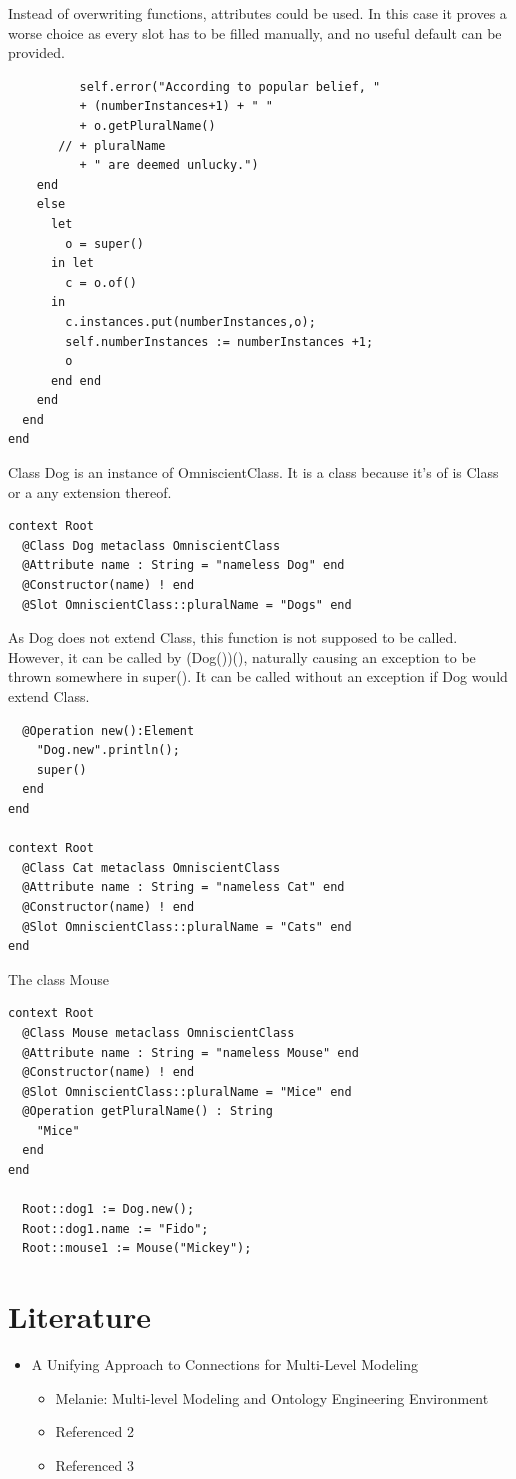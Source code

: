 \documentclass{scrreprt}
\newcommand{\layerOne}[1]{\chapter{#1}}
\begin{document}
Instead of overwriting functions, attributes could be used. In this case it
proves a worse choice as every slot has to be filled manually, and no useful
default can be provided.
\begin{verbatim}
          self.error("According to popular belief, " 
          + (numberInstances+1) + " " 
          + o.getPluralName() 
       // + pluralName 
          + " are deemed unlucky.")
    end
    else 
      let 
        o = super()
      in let
        c = o.of()
      in
        c.instances.put(numberInstances,o);
        self.numberInstances := numberInstances +1;
        o
      end end
    end
  end
end
\end{verbatim}
Class {\ttfamily Dog} is an instance of {\ttfamily OmniscientClass}. It is a
class because it's {\ttfamily of} is {\ttfamily Class} or a any extension
thereof.
\begin{verbatim}
context Root
  @Class Dog metaclass OmniscientClass
  @Attribute name : String = "nameless Dog" end
  @Constructor(name) ! end
  @Slot OmniscientClass::pluralName = "Dogs" end
\end{verbatim}
As {\ttfamily Dog} does not extend {\ttfamily Class}, this function is not
supposed to be called. However, it can be called by {\ttfamily(Dog())()},
naturally causing an exception to be thrown somewhere in {\ttfamily super()}.
It can be called without an exception if {\ttfamily Dog} would extend {\ttfamily Class}.
\begin{verbatim}
  @Operation new():Element
    "Dog.new".println();
    super()
  end
end

context Root
  @Class Cat metaclass OmniscientClass
  @Attribute name : String = "nameless Cat" end
  @Constructor(name) ! end
  @Slot OmniscientClass::pluralName = "Cats" end
end
\end{verbatim}
The class {\ttfamily Mouse} 
\begin{verbatim}
context Root
  @Class Mouse metaclass OmniscientClass
  @Attribute name : String = "nameless Mouse" end
  @Constructor(name) ! end
  @Slot OmniscientClass::pluralName = "Mice" end
  @Operation getPluralName() : String  
    "Mice"
  end
end

  Root::dog1 := Dog.new();
  Root::dog1.name := "Fido";
  Root::mouse1 := Mouse("Mickey");
\end{verbatim}

\layerOne{Literature}

\begin{itemize}
  \item A Unifying Approach to Connections for Multi-Level Modeling
  \cite{article:AtkinsonGerbigKuehne2015}
  \begin{itemize}
  \item Melanie: Multi-level Modeling and Ontology Engineering
  Environment \cite{article:AtkinsonGerbig2012}
  \item Referenced 2
  \item Referenced 3
\end{itemize}
\end{itemize}

\nocite{article:test}



\clearpage
{}
{}


\end{document}

